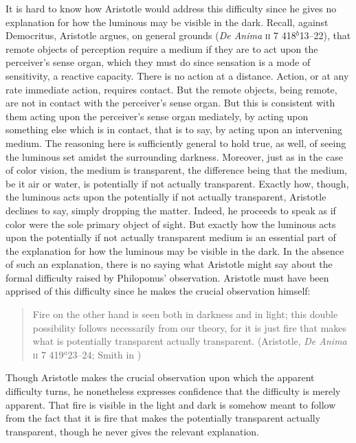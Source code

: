 It is hard to know how Aristotle would address this difficulty since he gives no explanation for how the luminous may be visible in the dark. Recall, against Democritus, Aristotle argues, on general grounds (\emph{De Anima} \textsc{ii} 7 418\( ^{b} \)13--22), that remote objects of perception require a medium if they are to act upon the perceiver's sense organ, which they must do since sensation is a mode of sensitivity, a reactive capacity. There is no action at a distance. Action, or at any rate immediate action, requires contact. But the remote objects, being remote, are not in contact with the perceiver's sense organ. But this is consistent with them acting upon the perceiver's sense organ mediately, by acting upon something else which is in contact, that is to say, by acting upon an intervening medium. The reasoning here is sufficiently general to hold true, as well, of seeing the luminous set amidst the surrounding darkness. Moreover, just as in the case of color vision, the medium is transparent, the difference being that the medium, be it air or water, is potentially if not actually transparent. Exactly how, though, the luminous acts upon the potentially if not actually transparent, Aristotle declines to say, simply dropping the matter. Indeed, he proceeds to speak as if color were the sole primary object of sight. But exactly how the luminous acts upon the potentially if not actually transparent medium is an essential part of the explanation for how the luminous may be visible in the dark. In the absence of such an explanation, there is no saying what Aristotle might say about the formal difficulty raised by Philoponus' observation. Aristotle must have been apprised of this difficulty since he makes the crucial observation himself:
\begin{quote}
	Fire on the other hand is seen both in darkness and in light; this double possibility follows necessarily from our theory, for it is just fire that makes what is potentially transparent actually transparent. (Aristotle, \emph{De Anima} \textsc{ii} 7 419\( ^{a} \)23--24; Smith in \citealt[34]{Barnes:1984uq})
\end{quote}
Though Aristotle makes the crucial observation upon which the apparent difficulty turns, he nonetheless expresses confidence that the difficulty is merely apparent. That fire is visible in the light and dark is somehow meant to follow from the fact that it is fire that makes the potentially transparent actually transparent, though he never gives the relevant explanation.

